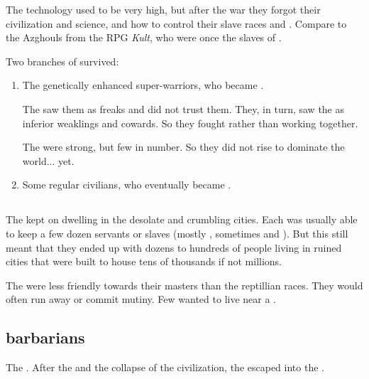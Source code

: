 The technology used to be very high, but after the war they forgot their civilization and science, and how to control their slave races and \daemons. 
Compare to the Azghouls from the RPG \emph{Kult}, who were once the slaves of \humans. 

Two branches of \ophidians{} survived: 

\begin{enumerate}
  \item 
    The genetically enhanced super-warriors, who became \dragons.
    
    The \quiljaaran{} saw them as freaks and did not trust them. 
    They, in turn, saw the \quiljaaran{} as inferior weaklings and cowards. 
    So they fought rather than working together. 
    
    The \dragons{} were strong, but few in number. 
    So they did not rise to dominate the world... yet. 
  \item 
    Some regular \ophidian{} civilians, who eventually became \quiljaaran. 
\end{enumerate}









\subsection{\QuilJaaran}
The \quiljaaran{} kept on dwelling in the desolate and crumbling \ophidian{} cities. 
Each \quiljaar{} was usually able to keep a few dozen servants or slaves (mostly \loculs, sometimes \cregorrs{} and \nephilim). 
But this still meant that they ended up with dozens to hundreds of people living in  ruined cities that were built to house tens of thousands if not millions. 

The \nephilim{} were less friendly towards their \quiljaaran{} masters than the reptillian races. 
They would often run away or commit mutiny. 
Few \nephilim{} wanted to live near a \quiljaar. 









\subsection{\Cregorr{} barbarians}
The \cregorrs{} . 
After the \firstbanewar{} and the collapse of the \ophidian{} civilization, the \cregorrs{} escaped into the \wylde. 

